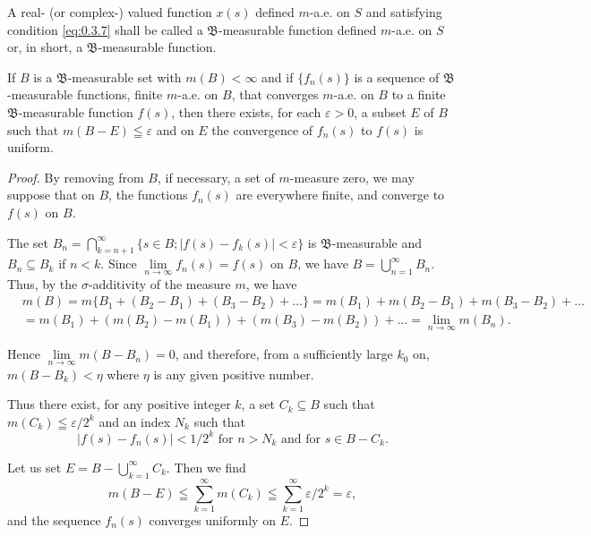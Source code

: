 A real- (or complex-) valued function $x(s)$ defined $m$-a.e. on $S$ and satisfying condition \eqref{eq:0.3.7} shall be called a $\mathfrak{B}$-measurable function defined $m$-a.e. on $S$ or, in short, a $\mathfrak{B}$-measurable function. 

\begin{theoremn} If $B$ is a $\mathfrak{B}$-measurable set with $m(B) < \infty$ and if $\{f_n(s)\}$ is a sequence of $\mathfrak{B}$-measurable functions, finite $m$-a.e. on $B$, that converges $m$-a.e. on $B$ to a finite $\mathfrak{B}$-measurable function $f(s)$, then there exists, for each $\varepsilon > 0$, a subset $E$ of $B$ such that $m(B- E) \leqq \varepsilon$ and on $E$ the convergence of $f_n(s)$ to $f(s)$ is uniform. 
\end{theoremn}

\begin{proof}
 By removing from $B$, if necessary, a set of $m$-measure zero, we may suppose that on $B$, the functions $f_{n}(s)$ are everywhere finite, and converge to $f(s)$ on $B$. 


The set $B_{n} = \bigcap\limits_{k=n+1}^{\infty}\{s\in B; |f(s)- f_{k}(s)| < \varepsilon\}$ is $\mathfrak{B}$-measurable and $B_{n} \subseteq B_{k}$ if $n < k$. Since $\lim\limits_{n\to\infty}f_{n}(s) = f(s)$ on $B$, we have $B = \bigcup\limits_{n=1}^{\infty}B_{n}$. Thus, by the $\sigma$-additivity of the measure $m$, we have 
\[
\begin{aligned}
&m(B)  = m \{B_{1} + (B_{2}- B_{1}) + (B_{3}- B_{2}) + \dots \} = m(B_{1}) + m(B_{2}- B_{1}) + m(B_{3}- B_{2}) + \dots \\
&= m(B_{1}) + (m(B_{2})- m(B_{1})) + (m(B_{3})- m(B_{2})) + \dots = \lim\limits _{n \to \infty} m(B_{n}).
\end{aligned}
\]

Hence $\lim\limits_{n\to \infty}m(B- B_n) = 0$, and therefore, from a sufficiently large $k_{0}$ on, $m(B- B_k) < \eta$ where $\eta$ is any given positive number. 

Thus there exist, for any positive integer $k$, a set $C_k \subseteq B$ such that $m(C_k) \leqq \varepsilon / 2^k$ and an index $N_k$ such that 
\[
\left| f (s)- f _{n} (s) \right| < 1 / 2 ^{k} \text{ for } n > N _{k} \text{ and for } s \in B- C _{k}.
\]

Let us set $E = B- \bigcup\limits_{k=1}^{\infty} C_k$. Then we find 
\[
m(B- E) \leqq \sum\limits_{k=1} ^{\infty} m(C _{k}) \leqq \sum\limits_{k=1} ^{\infty} \varepsilon / 2 ^{k} = \varepsilon ,
\]
and the sequence $f_{n}(s)$ converges uniformly on $E$.
\end{proof}

